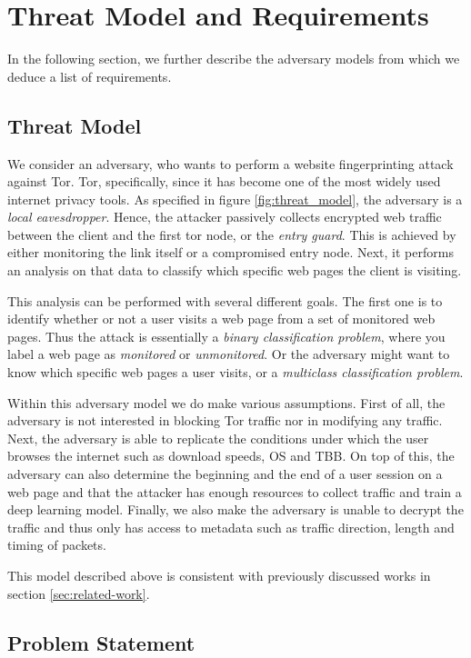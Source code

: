 \section{Threat Model and Requirements}

In the following section, we further describe the adversary models from which we deduce a list of requirements.

\subsection{Threat Model}

We consider an adversary, who wants to perform a website fingerprinting attack against Tor.
Tor, specifically, since it has become one of the most widely used internet privacy tools.
As specified in figure \ref{fig:threat_model}, the adversary is a \textit{local eavesdropper}.
Hence, the attacker passively collects encrypted web traffic between the client and the first tor node, or the \textit{entry guard}.
This is achieved by either monitoring the link itself or a compromised entry node.
Next, it performs an analysis on that data to classify which specific web pages the client is visiting.

This analysis can be performed with several different goals.
The first one is to identify whether or not a user visits a web page from a set of monitored web pages.
Thus the attack is essentially a \textit{binary classification problem}, where you label a web page as \textit{monitored} or \textit{unmonitored}.
Or the adversary might want to know which specific web pages a user visits, or a \textit{multiclass classification problem}.

Within this adversary model we do make various assumptions.
First of all, the adversary is not interested in blocking Tor traffic nor in modifying any traffic.
Next, the adversary is able to replicate the conditions under which the user browses the internet such as download speeds, OS and TBB.
On top of this, the adversary can also determine the beginning and the end of a user session on a web page and that the attacker has enough resources to collect traffic and train a deep learning model.
Finally, we also make the adversary is unable to decrypt the traffic and thus only has access to metadata such as traffic direction, length and timing of packets.

This model described above is consistent with previously discussed works in section \ref{sec:related-work}.

\subsection{Problem Statement}

